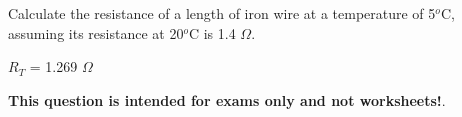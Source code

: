 

Calculate the resistance of a length of iron wire at a temperature of 5$^{o}$C, assuming its resistance at 20$^{o}$C is 1.4 $\Omega$.  







$R_T$ = 1.269 $\Omega$







{\bf This question is intended for exams only and not worksheets!}.



